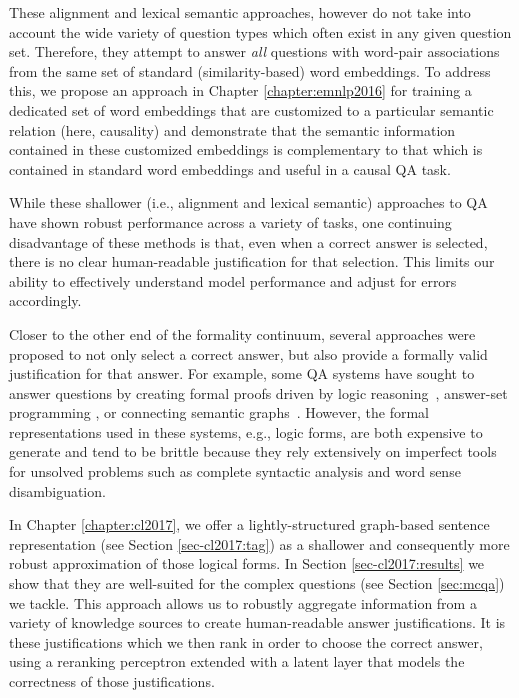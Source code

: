 These alignment and lexical semantic approaches, however do not take into account the wide variety of question types which often exist in any given question set.  Therefore, they attempt to answer \emph{all} questions with word-pair associations from the same set of standard (similarity-based) word embeddings.  To address this, we propose an approach in Chapter \ref{chapter:emnlp2016} for training a dedicated set of word embeddings that are customized to a particular semantic relation (here, causality) and demonstrate that the semantic information contained in these customized embeddings is complementary to that which is contained in standard word embeddings and useful in a causal QA task.

While these shallower (i.e., alignment and lexical semantic) approaches to QA have shown robust performance across a variety of tasks, one continuing disadvantage of these methods is that, even when a correct answer is selected, there is no clear human-readable justification for that selection.  This limits our ability to effectively understand model performance and adjust for errors accordingly.

Closer to the other end of the formality continuum, several approaches were proposed to not only select a correct answer, but also provide a formally valid justification for that answer.  For example, some QA systems have sought to answer questions by creating formal proofs driven by logic reasoning~\citep{moldovan2003cogex,moldovan2007cogex,balduccini2008knowledge,maccartney2009natural,liang2013learning,lewis2013combining}, answer-set programming \citep{baral2006using,baral2011towards,baral2012answering,baral2012knowledge}, or connecting semantic graphs~\citep{banarescu2012amr,sharmatowards}. 
However, the formal representations used in these systems, e.g., logic forms, are both expensive to generate and tend to be brittle because they rely extensively on imperfect tools for unsolved problems such as complete syntactic analysis and word sense disambiguation.

In Chapter \ref{chapter:cl2017}, we offer a lightly-structured graph-based sentence representation (see Section \ref{sec-cl2017:tag}) as a shallower and consequently more robust approximation of those logical forms.  In Section \ref{sec-cl2017:results} we show that they are well-suited for the complex questions (see Section \ref{sec:mcqa}) we tackle.
This approach allows us to robustly aggregate information from a variety of knowledge sources to create human-readable answer justifications.  
It is these justifications which we then rank in order to choose the correct answer, using a reranking perceptron extended with a latent layer that models the correctness of those justifications.

